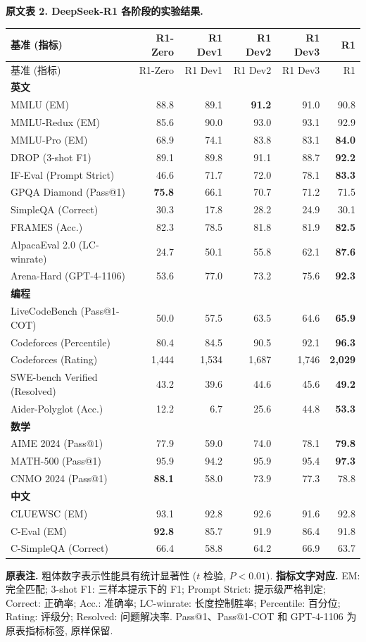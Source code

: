 \noindent\textbf{原文表 2. DeepSeek-R1 各阶段的实验结果.}
\begin{longtable}{p{5.2cm}rrrrr}
\toprule
基准 (指标) & R1-Zero & R1 Dev1 & R1 Dev2 & R1 Dev3 & R1 \\
\midrule
\endfirsthead
\toprule
基准 (指标) & R1-Zero & R1 Dev1 & R1 Dev2 & R1 Dev3 & R1 \\
\midrule
\endhead
\multicolumn{6}{l}{\textbf{英文}} \\
MMLU (EM) & 88.8 & 89.1 & \textbf{91.2} & 91.0 & 90.8 \\
MMLU-Redux (EM) & 85.6 & 90.0 & 93.0 & 93.1 & 92.9 \\
MMLU-Pro (EM) & 68.9 & 74.1 & 83.8 & 83.1 & \textbf{84.0} \\
DROP (3-shot F1) & 89.1 & 89.8 & 91.1 & 88.7 & \textbf{92.2} \\
IF-Eval (Prompt Strict) & 46.6 & 71.7 & 72.0 & 78.1 & \textbf{83.3} \\
GPQA Diamond (Pass@1) & \textbf{75.8} & 66.1 & 70.7 & 71.2 & 71.5 \\
SimpleQA (Correct) & 30.3 & 17.8 & 28.2 & 24.9 & 30.1 \\
FRAMES (Acc.) & 82.3 & 78.5 & 81.8 & 81.9 & \textbf{82.5} \\
AlpacaEval 2.0 (LC-winrate) & 24.7 & 50.1 & 55.8 & 62.1 & \textbf{87.6} \\
Arena-Hard (GPT-4-1106) & 53.6 & 77.0 & 73.2 & 75.6 & \textbf{92.3} \\
\multicolumn{6}{l}{\textbf{编程}} \\
LiveCodeBench (Pass@1-COT) & 50.0 & 57.5 & 63.5 & 64.6 & \textbf{65.9} \\
Codeforces (Percentile) & 80.4 & 84.5 & 90.5 & 92.1 & \textbf{96.3} \\
Codeforces (Rating) & 1,444 & 1,534 & 1,687 & 1,746 & \textbf{2,029} \\
SWE-bench Verified (Resolved) & 43.2 & 39.6 & 44.6 & 45.6 & \textbf{49.2} \\
Aider-Polyglot (Acc.) & 12.2 & 6.7 & 25.6 & 44.8 & \textbf{53.3} \\
\multicolumn{6}{l}{\textbf{数学}} \\
AIME 2024 (Pass@1) & 77.9 & 59.0 & 74.0 & 78.1 & \textbf{79.8} \\
MATH-500 (Pass@1) & 95.9 & 94.2 & 95.9 & 95.4 & \textbf{97.3} \\
CNMO 2024 (Pass@1) & \textbf{88.1} & 58.0 & 73.9 & 77.3 & 78.8 \\
\multicolumn{6}{l}{\textbf{中文}} \\
CLUEWSC (EM) & 93.1 & 92.8 & 92.6 & 91.6 & 92.8 \\
C-Eval (EM) & \textbf{92.8} & 85.7 & 91.9 & 86.4 & 91.8 \\
C-SimpleQA (Correct) & 66.4 & 58.8 & 64.2 & 66.9 & 63.7 \\
\bottomrule
\end{longtable}
\noindent\textbf{原表注.} 粗体数字表示性能具有统计显著性 ($t$ 检验, $P<0.01$).
\noindent\textbf{指标文字对应.} EM: 完全匹配; 3-shot F1: 三样本提示下的 F1; Prompt Strict: 提示级严格判定; Correct: 正确率; Acc.: 准确率; LC-winrate: 长度控制胜率; Percentile: 百分位; Rating: 评级分; Resolved: 问题解决率. Pass@1、Pass@1-COT 和 GPT-4-1106 为原表指标标签, 原样保留.
